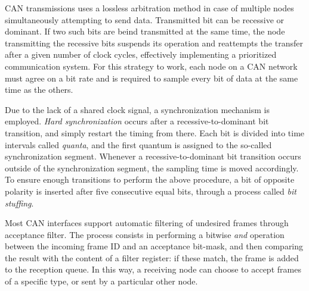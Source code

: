 CAN transmissions uses a lossless arbitration method in case of multiple nodes simultaneously attempting to send data.
Transmitted bit can be recessive or dominant.
If two such bits are beind transmitted at the same time, the node transmitting the recessive bits suspends its operation and reattempts the transfer after a given number of clock cycles, effectively implementing a prioritized communication system.
For this strategy to work, each node on a CAN network must agree on a bit rate and is required to sample every bit of data at the same time as the others.

Due to the lack of a shared clock signal, a synchronization mechanism is employed.
\emph{Hard synchronization} occurs after a recessive-to-dominant bit transition, and simply restart the timing from there.
Each bit is divided into time intervals called \emph{quanta}, and the first quantum is assigned to the so-called synchronization segment.
Whenever a recessive-to-dominant bit transition occurs outside of the synchronization segment, the sampling time is moved accordingly.
To ensure enough transitions to perform the above procedure, a bit of opposite polarity is inserted after five consecutive equal bits, through a process called \emph{bit stuffing}.


Most CAN interfaces support automatic filtering of undesired frames through acceptance filter.
The process consists in performing a bitwise \emph{and} operation between the incoming frame ID and an acceptance bit-mask, and then comparing the result with the content of a filter register: if these match, the frame is added to the reception queue.
In this way, a receiving node can choose to accept frames of a specific type, or sent by a particular other node.
